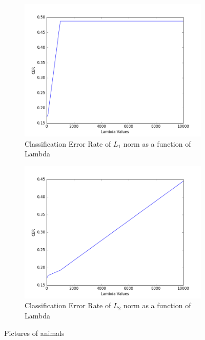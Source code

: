 \documentclass[10pt,twoside]{article}
\begin{document}
\begin{figure}[h]
        \begin{subfigure}[b]{0.5\textwidth}
                \centering
                \includegraphics[width=\linewidth]{Figures/P1/B_CERL1.png}
                \caption{Classification Error Rate of $L_1$ norm as a function of Lambda}
        \end{subfigure}%
        \begin{subfigure}[b]{0.5\textwidth}
                \centering
                \includegraphics[width=\linewidth]{Figures/P1/B_CERL2.png}
                \caption{Classification Error Rate of $L_2$ norm as a function of Lambda}
        \end{subfigure}
        \caption{Pictures of animals}
\end{figure}
\end{document}
